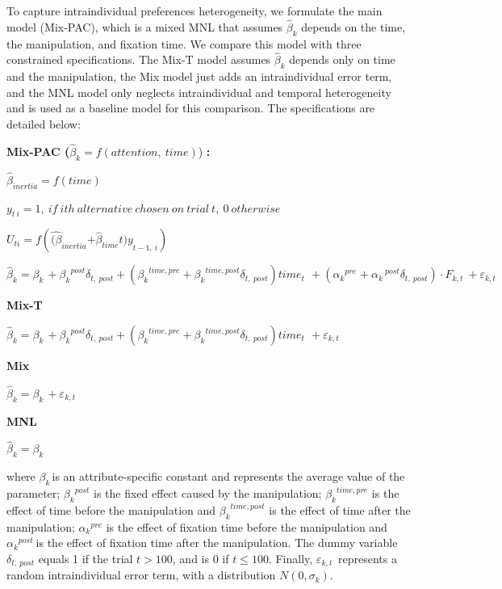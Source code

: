 To capture intraindividual preferences heterogeneity, we formulate the main model (Mix-PAC), which is a mixed MNL that assumes \({\widehat{\beta}}_{k}\) depends on the time, the manipulation, and fixation time. We compare this model with three constrained specifications. The Mix-T model assumes \({\widehat{\beta}}_{k}\) depends only on time and the manipulation, the Mix model just adds an intraindividual error term, and the MNL model only neglects intraindividual and temporal heterogeneity and is used as a baseline model for this comparison. The specifications are detailed below:

\textbf{Mix-PAC (}\({\widehat{\beta}}_{k} = f(attention,\ time)\)) \textbf{:}

\({\widehat{\beta}}_{inertia} = f(time)\)

\(y_{t\ i} = 1,\ if\ ith\ alternative\ chosen\ on\ trial\ t,\ 0\ otherwise\)

\(U_{ti} = f({\widehat{(\beta}}_{inertia}{+ {\widehat{\beta}}_{time}t)y}_{t - 1,\ i})\)

\({\widehat{\beta}}_{k} = \beta_{k\ } + {\beta_{k}}^{post}\delta_{t,\ post} + ({\beta_{k}}^{time,pre} + {\beta_{k}}^{time,post}\delta_{t,\ post})time_{t\ }\  + ({{\alpha_{k}}^{pre}}^{} + {\alpha_{k}}^{\ post}\delta_{t,\ post}) \cdot F_{k,t}\  + \varepsilon_{k,t\ }\)

\textbf{Mix-T}

\({\widehat{\beta}}_{k} = \beta_{k\ } + {\beta_{k}}^{post}\delta_{t,\ post} + ({\beta_{k}}^{time,pre} + {\beta_{k}}^{time,post}\delta_{t,\ post})time_{t\ }\  + \varepsilon_{k,t\ }\)

\textbf{Mix}

\({\widehat{\beta}}_{k} = \beta_{k\ } + \varepsilon_{k,t\ }\)

\textbf{MNL}

\({\widehat{\beta}}_{k} = \beta_{k\ }\)

where \(\beta_{k\ }\)is an attribute-specific constant and represents the average value of the parameter; \({\beta_{k}}^{post}\) is the fixed effect caused by the manipulation; \({\beta_{k}}^{time,pre}\) is the effect of time before the manipulation and \({\beta_{k}}^{time,post}\) is the effect of time after the manipulation; \({\alpha_{k}}^{pre}\) is the effect of fixation time before the manipulation and \({\alpha_{k}}^{post}\ \)is the effect of fixation time after the manipulation. The dummy variable \(\delta_{t,\ post}\) equals 1 if the trial \(t > 100\), and is 0 if \(t \leq 100\). Finally, \(\varepsilon_{k,t\ }\) represents a random intraindividual error term, with a distribution \(N(0,\sigma_{k})\).

